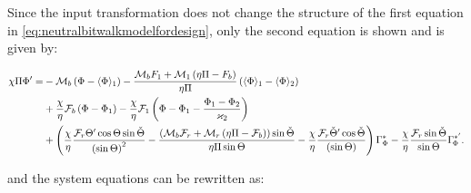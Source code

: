 \documentclass[main.tex]{subfiles}
\begin{document}
	Since the input transformation does not change the structure of the first equation in \eqref{eq:neutralbitwalkmodelfordesign}, only the second equation is shown and is given by:
	
	\begin{equation}
	\begin{aligned}
	\chi \Pi \Phi ' =  &- {\mathcal{M}_b}\left( {\Phi  - {\langle{\rm{\Phi }} \rangle_1}} \right)-\frac{{{\mathcal{M}_b}{F_1} + {\mathcal{M}_1}\left( {\eta \Pi  - {F_b}} \right)}}{{\eta \Pi }}\left( {{\langle{\rm{\Phi }} \rangle_1} - {\langle{\rm{\Phi }} \rangle_{2}}} \right)
	\\
	&+\frac{\chi }{\eta }{\mathcal{F}_b}\left( {{\rm{\Phi }} - {{\rm{\Phi }}_1}} \right)
	- \frac{\chi }{\eta }{\mathcal{F}_1}\left( {{{{{\rm{\Phi }}} - {{\rm{\Phi }}_1}}} - \frac{{{{\rm{\Phi }}_1} - {{\rm{\Phi }}_{2}}}}{{{\varkappa _{2}}}}} \right)
	\\
	&+ \left( {\frac{\chi }{\eta }\frac{{{\mathcal{F}_r}\Theta '\cos \Theta \sin \check{\Theta} }}{{{{\left( {\sin \Theta } \right)}^2}}}
		- \frac{{{(\mathcal{M}_b}{\mathcal{F}_r} + {\mathcal{M}_r}\left( {\eta \Pi  - {\mathcal{F}_b}}) \right)\sin\check{\Theta}}}{{\eta \Pi \sin \Theta }} - \frac{\chi }{\eta }\frac{{{\mathcal{F}_r}\check{\Theta} '\cos \check{\Theta}}}{{{{\left( {\sin \Theta } \right)}}}}} \right){\Gamma _{\Phi}^*}
	- \frac{\chi }{\eta }\frac{{{\mathcal{F}_r \sin \check{\Theta}}}}{{\sin \Theta }}\Gamma_{\!\Phi}^{* '}.
	\end{aligned}
	\label{neutralbitwalkphi}
	\end{equation}
	

	and the system equations can be rewritten as:
\end{document}
